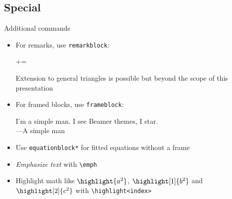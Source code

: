 \documentclass{beamer}
\begin{document}
\subsection{Special}

\begin{frame}[fragile]{Additional commands}
\begin{itemize}
	\item For remarks, 	use \texttt{remarkblock}:
    \begin{equationblock}
	+=
	\end{equationblock}
	\begin{remarkblock}
		\centering Extension to general triangles is possible but beyond the scope of this presentation
	\end{remarkblock}

	\item For framed blocks, use \texttt{frameblock}:
	\begin{frameblock}
		I'm a simple man. I see Beamer themes, I star.\\
		\phantom{}\hfill ---A simple man
	\end{frameblock}

	\item Use \verb|equationblock*| for fitted equations without a frame
	\item \emph{Emphasize text} with \verb|\emph|
	\item Highlight math like $\highlight{a^2}$, $\highlight[1]{b^2}$ and $\highlight[2]{c^2}$ with \verb|\highlight<index>|
\end{itemize}
\end{frame}
\end{document}

